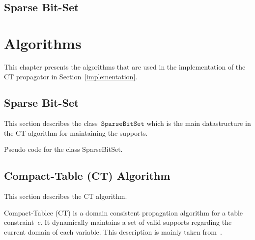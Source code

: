 \documentclass[a4paper,11pt]{article}
\newcommand{\Chapref}[1]{Section~\ref{#1}}
\newcommand{\SparseBitSet}{\texttt{SparseBitSet}}
\begin{document}
\subsection{Sparse Bit-Set}
\label{bg:sbc}

\section{Algorithms}
\label{algorithms}


This chapter presents the algorithms that are used in the implementation of the
CT propagator in \Chapref{implementation}.

\subsection{Sparse Bit-Set}
This section describes the class~$\SparseBitSet$ which is the main datastructure
in the CT algorithm for maintaining the supports.

\begin{algorithm}[h]
  \begin{algorithmic}[1]  %
    
    \end{algorithmic}
  \caption{Pseudo code for the class SparseBitSet.}
  \label{algo:sparse}
\end{algorithm}

\subsection{Compact-Table (CT) Algorithm}
This section describes the CT algorithm.

Compact-Tablce (CT) is a domain consistent propagation algorithm 
for a table constraint~$c$. It dynamically
maintains a set of valid supports regarding the current domain of each variable.
This description is mainly taken from~\cite{CTpaper}.
\end{document}
